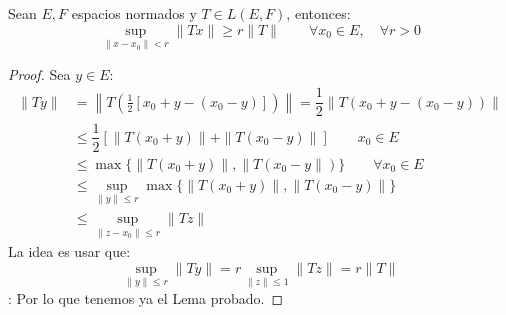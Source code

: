 \begin{lema}\label{lema:acotacion_uniforme}
    Sean $E,F$ espacios normados y $T\in L(E,F)$, entonces:
    \begin{equation*}
        \sup_{\|x-x_0\| <r} \|Tx\| \geq r\|T\|\qquad \forall x_0\in E, \quad \forall r>0
    \end{equation*}
    \begin{proof}
        Sea $y\in E$: 
        \begin{align*}
            \|Ty\| &= \left\|T\left(\frac{1}{2}\left[x_0 + y - (x_0-y)\right]\right)\right\| = \dfrac{1}{2}\|T(x_0 + y - (x_0-y))\| \\ 
                   &\leq \dfrac{1}{2}\left[\|T(x_0+y)\| + \|T(x_0-y)\|\right] \qquad x_0 \in E \\
                   &\leq \max\{\|T(x_0+y)\|,\|T(x_0-y\|)\} \qquad \forall x_0\in E \\
                   &\leq \sup_{\|y\|\leq r} \max\{\|T(x_0+y)\|, \|T(x_0-y)\|\} \\
                   &\leq \sup_{\|z-x_0\| \leq r} \|Tz\|
        \end{align*}
        La idea es usar que:
        \begin{equation*}
            \sup_{\|y\|\leq r}\|Ty\| = r\sup_{\|z\|\leq 1}\|Tz\| = r\|T\|
        \end{equation*}
    :   Por lo que tenemos ya el Lema probado.
    \end{proof}
\end{lema}

